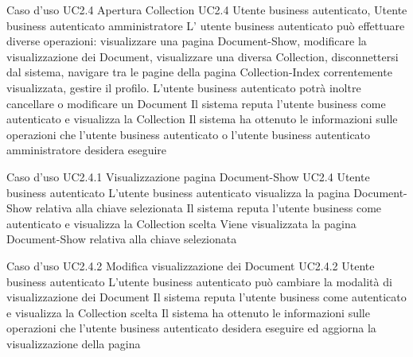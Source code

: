 \UCtitle
{Caso d'uso UC2.4}
{Apertura Collection}
\UC
{UC2.4}
{Utente business autenticato, Utente business autenticato amministratore}
{L’ utente business autenticato può effettuare diverse operazioni: visualizzare una pagina Document-Show, modificare la visualizzazione dei Document, visualizzare una diversa Collection, disconnettersi dal sistema, navigare tra le pagine della pagina Collection-Index correntemente visualizzata,  gestire il profilo. L'utente business autenticato  potrà inoltre cancellare o modificare un Document}
{Il sistema reputa l'utente business come autenticato e visualizza la Collection}
\post
{Il sistema ha ottenuto le informazioni sulle operazioni che l'utente business autenticato o l'utente business autenticato amministratore desidera eseguire}



\UCtitle
{Caso d'uso UC2.4.1}
{Visualizzazione pagina Document-Show}
\UC
{UC2.4}
{Utente business autenticato}
{L'utente business autenticato visualizza la pagina Document-Show relativa alla chiave selezionata}
{Il sistema reputa l'utente business come autenticato e visualizza la Collection scelta}
\post
{Viene visualizzata la pagina Document-Show relativa alla chiave selezionata}


\UCtitle
{Caso d'uso UC2.4.2}
{Modifica visualizzazione dei Document}
\UC
{UC2.4.2}
{Utente business autenticato}
{L'utente business autenticato può cambiare la modalità di visualizzazione dei Document}
{Il sistema reputa l'utente business come autenticato e visualizza la Collection scelta}
\post
{Il sistema ha ottenuto le informazioni sulle operazioni che l'utente business autenticato desidera eseguire ed aggiorna la visualizzazione della pagina}

